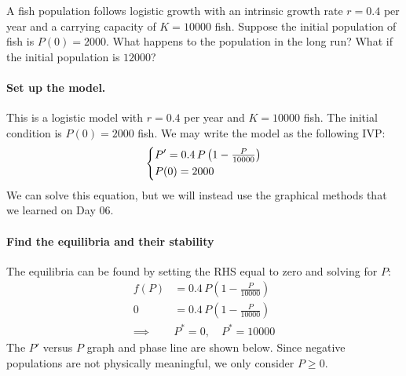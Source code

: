 \documentclass[09pt,letterpaper]{article}
\begin{document}
\begin{example}[2]{    
A fish population follows logistic growth with an intrinsic growth rate $r=0.4$ per year and a carrying capacity of $K=10000$ fish.
Suppose the initial population of fish is $P(0)=2000$. What happens to the population in the long run? What if the initial population is $12000$?
}

\paragraph{Set up the model.} This is a logistic model with $r=0.4$ per year and $K=10000$ fish. The initial condition is $P(0)=2000$ fish. We may write the model as the following IVP: 
$$
\begin{dcases}
    P' = 0.4\,P\left(1-\tfrac{P}{10000}\right)\\
    P(0)=2000
\end{dcases}
$$
We can solve this equation, but we will instead use the graphical methods that we learned on Day 06.

\paragraph{Find the equilibria and their stability}
The equilibria can be found by setting the RHS equal to zero and solving for $P$:
\begin{align*}
     f(P)&=0.4\,P\left(1-\tfrac{P}{10000}\right)\\
        0&=0.4\,P\left(1-\tfrac{P}{10000}\right)\\
     \implies&P^*=0, \quad P^*= 10000
\end{align*}
The $P'$ versus $P$ graph and phase line are shown below. Since negative
populations are not physically meaningful, we only consider $P\geq0$.
\begin{figure}[H]
    \centering
{}
\end{figure}


\end{example}
\end{document}
